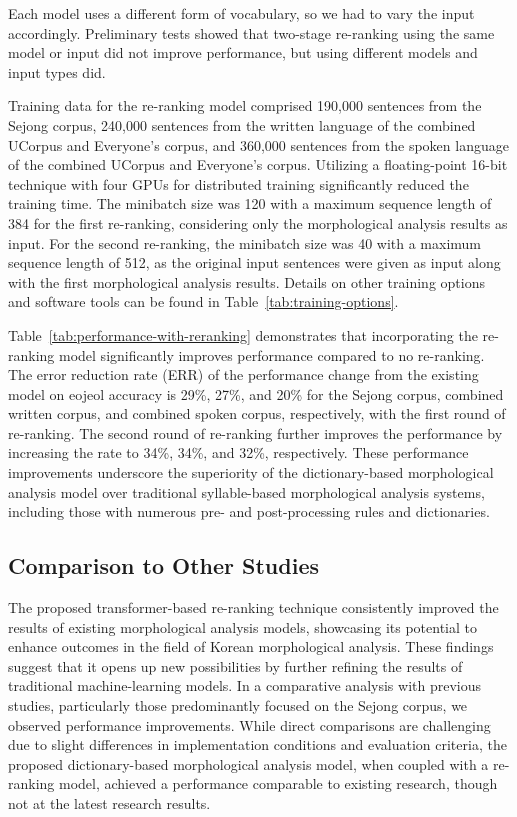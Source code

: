 \documentclass[AMS,STIX2COL]{WileyNJD-v2}
\begin{document}
    Each model uses a different form of vocabulary, so we had to vary the input accordingly.
    Preliminary tests showed that two-stage re-ranking using the same model or input did not improve performance, but using different models and input types did.

    Training data for the re-ranking model comprised 190,000 sentences from the Sejong corpus, 240,000 sentences from the written language of the combined UCorpus and Everyone's corpus, and 360,000 sentences from the spoken language of the combined UCorpus and Everyone's corpus.
    Utilizing a floating-point 16-bit technique with four GPUs for distributed training significantly reduced the training time.
    The minibatch size was 120 with a maximum sequence length of 384 for the first re-ranking, considering only the morphological analysis results as input.
    For the second re-ranking, the minibatch size was 40 with a maximum sequence length of 512, as the original input sentences were given as input along with the first morphological analysis results.
    Details on other training options and software tools can be found in Table~\ref{tab:training-options}.

    Table~\ref{tab:performance-with-reranking} demonstrates that incorporating the re-ranking model significantly improves performance compared to no re-ranking.
    The error reduction rate (ERR) of the performance change from the existing model on eojeol accuracy is 29\%, 27\%, and 20\% for the Sejong corpus, combined written corpus, and combined spoken corpus, respectively, with the first round of re-ranking.
    The second round of re-ranking further improves the performance by increasing the rate to 34\%, 34\%, and 32\%, respectively.
    These performance improvements underscore the superiority of the dictionary-based morphological analysis model over traditional syllable-based morphological analysis systems, including those with numerous pre- and post-processing rules and dictionaries.

    \subsection{Comparison to Other Studies}\label{subsec:comparison-to-other-studies}

    The proposed transformer-based re-ranking technique consistently improved the results of existing morphological analysis models, showcasing its potential to enhance outcomes in the field of Korean morphological analysis.
    These findings suggest that it opens up new possibilities by further refining the results of traditional machine-learning models.
    In a comparative analysis with previous studies, particularly those predominantly focused on the Sejong corpus, we observed performance improvements.
    While direct comparisons are challenging due to slight differences in implementation conditions and evaluation criteria, the proposed dictionary-based morphological analysis model, when coupled with a re-ranking model, achieved a performance comparable to existing research, though not at the latest research results.
\end{document}
